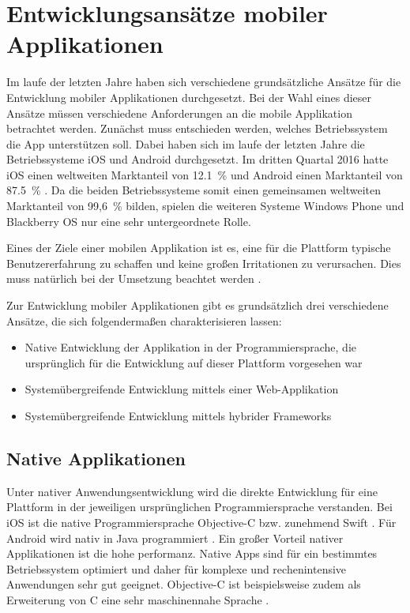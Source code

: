 \chapter{Entwicklungsansätze mobiler Applikationen}
\label{chap:entwicklungsansaetze}
%
%
Im laufe der letzten Jahre haben sich verschiedene grundsätzliche Ansätze für die Entwicklung mobiler Applikationen durchgesetzt. Bei der Wahl eines dieser Ansätze müssen verschiedene Anforderungen an die mobile Applikation betrachtet werden. Zunächst muss entschieden werden, welches Betriebssystem die App unterstützen soll. Dabei haben sich im laufe der letzten Jahre die Betriebssysteme iOS und Android durchgesetzt. Im dritten Quartal 2016 hatte iOS einen weltweiten Marktanteil von 12.1~\% und Android einen Marktanteil von 87.5~\% \cite{strategyAnalyticsMarktanteile}. Da die beiden Betriebssysteme somit einen gemeinsamen weltweiten Marktanteil von 99,6~\%  bilden, spielen die weiteren Systeme Windows Phone und Blackberry OS nur eine sehr untergeordnete Rolle.

Eines der Ziele einer mobilen Applikation ist es, eine für die Plattform typische Benutzererfahrung zu schaffen und keine großen Irritationen zu verursachen. Dies muss natürlich bei der Umsetzung beachtet werden \cite{FrancisHybridApp}.

Zur Entwicklung mobiler Applikationen gibt es grundsätzlich drei verschiedene Ansätze, die sich folgendermaßen charakterisieren lassen:
\begin{itemize}
    \item Native Entwicklung der Applikation in der Programmiersprache, die ursprünglich für die Entwicklung auf dieser Plattform vorgesehen war
    \item Systemübergreifende Entwicklung mittels einer Web-Applikation
    \item Systemübergreifende Entwicklung mittels hybrider Frameworks
\end{itemize}
%
%
\section{Native Applikationen}
\label{sec:nativeApplikationen}
%
Unter nativer Anwendungsentwicklung wird die direkte Entwicklung für eine Plattform in der jeweiligen ursprünglichen Programmiersprache verstanden. Bei iOS ist die native Programmiersprache Objective-C bzw. zunehmend Swift \cite{appleDokuSwift}. Für Android wird nativ in Java programmiert \cite{googleAndroidDoku}. Ein großer Vorteil nativer Applikationen ist die hohe performanz. Native Apps sind für ein bestimmtes Betriebssystem optimiert und daher für komplexe und rechenintensive Anwendungen sehr gut geeignet. Objective-C ist beispielsweise zudem als Erweiterung von C eine sehr maschinennahe Sprache \cite{appleObjectiveC}. 

